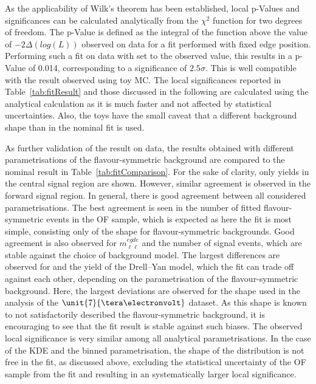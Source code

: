 As the applicability of Wilk's theorem has been established, local p-Values and significances can be calculated analytically from the $\chi^2$ function for two degrees of freedom. The p-Value is defined as the integral of the function above the value of $-2\Delta(log(L))$ observed on data for a fit performed with fixed edge position. Performing such a fit on data with \mlledge set to the observed value, this results in a p-Value of 0.014, corresponding to a significance of $2.5\sigma$. This is well compatible with the result observed using toy MC. The local significances reported in Table~\ref{tab:fitResult} and those discussed in the following are calculated using the analytical calculation as it is much faster and not affected by statistical uncertainties. Also, the toys have the small caveat that a different background shape than in the nominal fit is used. 

As further validation of the result on data, the results obtained with different parametrisations of the flavour-symmetric background are compared to the nominal result in Table~\ref{tab:fitComparison}. For the sake of clarity, only yields in the central signal region are shown. However, similar agreement is observed in the forward signal region. In general, there is good agreement between all considered parametrisations. The best agreement is seen in the number of fitted flavour-symmetric events in the OF sample, which is expected as here the fit is most simple, consisting only of the shape for flavour-symmetric backgrounds. Good agreement is also observed for $m_{\ell\ell}^{egde}$ and the number of signal events, which are stable against the choice of background model. The largest differences are observed for \Rsfof and the yield of the Drell--Yan model, which the fit can trade off against each other, depending on the parametrisation of the flavour-symmetric background. Here, the largest deviations are observed for the shape used in the analysis of the $\unit{7}{\tera\electronvolt}$ dataset. As this shape is known to not satisfactorily described the flavour-symmetric background, it is encouraging to see that the fit result is stable against such biases. The observed local significance is very similar among all analytical parametrisations. In the case of the KDE and the binned parametrisation, the shape of the distribution is not free in the fit, as discussed above, excluding the statistical uncertainty of the OF sample from the fit and resulting in an systematically larger local significance. 



